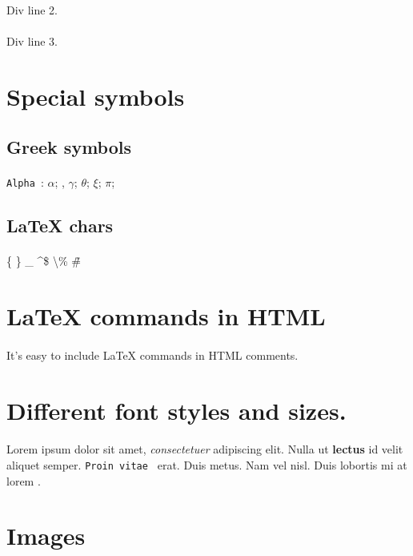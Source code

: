 \documentclass{article}
\begin{document}
\paragraph{}Div line 2.  \newline
\newline
\paragraph{}Div line 3. \newline
\section*{Special symbols }
\subsection*{Greek symbols }
\paragraph{}\texttt{Alpha }: $\alpha$; , $\gamma$; $\theta$; $\xi$; $\pi$;  \subsection*{LaTeX chars }
\paragraph{}\{ \} \_ \^ \@ \$ \textbackslash \% \~ \# \section*{LaTeX commands in HTML }
\paragraph{}It's easy to include LaTeX commands in HTML comments. \section*{Different font styles and sizes. }
\paragraph{}Lorem ipsum  {\fontsize{7}{10}\selectfont  dolor } sit amet,  \textit{consectetuer } adipiscing elit. Nulla ut  \textbf{lectus } id velit aliquet semper.  \texttt{Proin vitae } erat. Duis metus. Nam vel nisl. Duis  \small{lobortis }  mi at  {\fontsize{1}{10}\selectfont  lorem }. \section*{Images }
\end{document}
